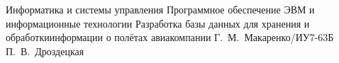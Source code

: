 \documentclass[a4paper,14pt, unknownkeysallowed]{extreport}
\begin{document}
	\makecourseworktitle
	{Информатика и системы управления}
	{Программное обеспечение ЭВМ и информационные технологии}
	{Разработка базы данных для хранения и обработкиинформации о полётах авиакомпании}
	{Г.~М.~Макаренко/ИУ7-63Б}
	{П.~В.~Дроздецкая}
	{}

	\setcounter{page}{3}

	
	

	
	
	
	
	
	

	
	
\end{document}
